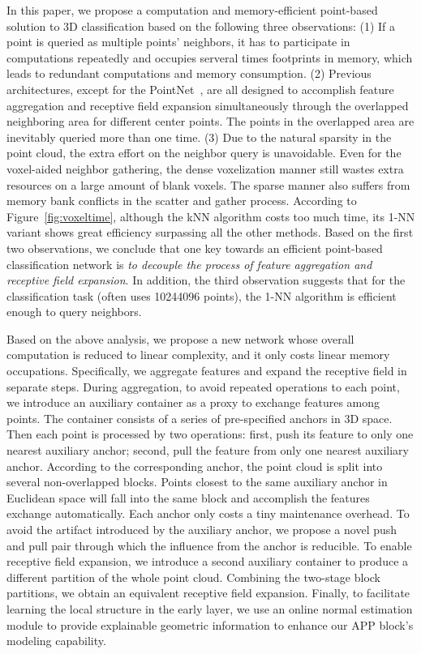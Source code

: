 \documentclass[journal]{IEEEtran}
\begin{document}
In this paper, we propose a computation and memory-efficient point-based solution to 3D classification based on the following three observations: (1) If a point is queried as multiple points' neighbors, it has to participate in computations repeatedly and occupies serveral times footprints in memory, which leads to redundant computations and memory consumption. (2) Previous architectures, except for the PointNet~\cite{PointNet}, are all designed to accomplish feature aggregation and receptive field expansion simultaneously through the overlapped neighboring area for different center points. The points in the overlapped area are inevitably queried more than one time. (3) Due to the natural sparsity in the point cloud, the extra effort on the neighbor query is unavoidable. Even for the voxel-aided neighbor gathering, the dense voxelization manner still wastes extra resources on a large amount of blank voxels. The sparse manner also suffers from memory bank conflicts in the scatter and gather process. According to Figure~\ref{fig:voxeltime}, although the kNN algorithm costs too much time, its 1-NN variant shows great efficiency surpassing all the other methods. Based on the first two observations, we conclude that one key towards an efficient point-based classification network is {\em to decouple the process of feature aggregation and receptive field expansion}. In addition,  the third observation suggests that for the classification task (often uses 10244096 points), the 1-NN algorithm is efficient enough to query neighbors. 

 Based on the above analysis, we propose a new network whose overall computation is reduced to linear complexity, and it only costs linear memory occupations. Specifically, we aggregate features and expand the receptive field in separate steps. During aggregation, to avoid repeated operations to each point, we introduce an auxiliary container as a proxy to exchange features among points. The container consists of a series of pre-specified anchors in 3D space. Then each point is processed by two operations: first, push its feature to only one nearest auxiliary anchor; second, pull the feature from only one nearest auxiliary anchor. According to the corresponding anchor, the point cloud is split into several non-overlapped blocks. Points closest to the same auxiliary anchor in Euclidean space will fall into the same block and accomplish the features exchange automatically. Each anchor only costs a tiny maintenance overhead. To avoid the artifact introduced by the auxiliary anchor, we propose a novel push and pull pair through which the influence from the anchor is reducible. To enable receptive field expansion, we introduce a second auxiliary container to produce a different partition of the whole point cloud. Combining the two-stage block partitions, we obtain an equivalent receptive field expansion. Finally, to facilitate learning the local structure in the early layer, we use an online normal estimation module to provide explainable geometric information to enhance our APP block's modeling capability. 
 
\end{document}
